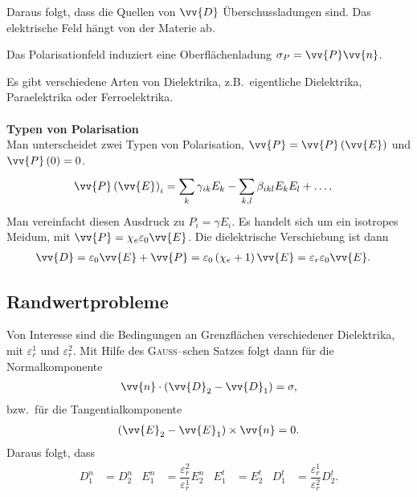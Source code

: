 \documentclass[a4paper,12pt]{article}
\numberwithin{equation}{section}
\begin{document}
Daraus folgt, dass die Quellen von $\vv{D}$ Überschussladungen sind.
Das elektrische Feld hängt von der Materie ab.\par
Das Polarisationfeld induziert eine Oberflächenladung $\sigma _P=\vv{P}\vv{n}$.\par
Es gibt verschiedene Arten von Dielektrika, z.B.\ eigentliche Dielektrika, Paraelektrika oder Ferroelektrika.
\\\hfill\\\textbf{Typen von Polarisation}\\ 
Man unterscheidet zwei Typen von Polarisation, $\vv{P}=\vv{P}\left(\vv{E}\right)$ und $\vv{P}\left(0\right)=0$.
\begin{align} 
        \vv{P}\left(\vv{E}\right)_i&=\sum_{k}^{}\gamma _{ik}E_k-\sum_{k,l}^{}\beta _{ikl}E_kE_l+\hdots 
.\end{align} 
Man vereinfacht diesen Ausdruck zu $P_i=\gamma E_i$.
Es handelt sich um ein isotropes Meidum, mit $\vv{P}=\chi_e \varepsilon _0\vv{E}$.
Die dielektrische Verschiebung ist dann
\begin{align} 
        \vv{D}=\varepsilon _0\vv{E}+\vv{P}=\varepsilon _0\left(\chi_e+1\right)\vv{E}&=\varepsilon _r\varepsilon _0\vv{E}
.\end{align} 

\subsection{Randwertprobleme}
Von Interesse sind die Bedingungen an Grenzflächen verschiedener Dielektrika, mit $\varepsilon ^1_r$ und $\varepsilon ^2_r$.
Mit Hilfe des \textsc{Gauss}--schen Satzes folgt dann für die Normalkomponente
\begin{align} 
        \vv{n}\cdot \left(\vv{D}_2-\vv{D}_1\right)=\sigma 
,\end{align} 
bzw.\ für die Tangentialkomponente
\begin{align} 
        \left(\vv{E}_2-\vv{E}_1\right)\times \vv{n}=0
.\end{align} 
Daraus folgt, dass
\begin{align} 
        D_1^n&=D_2^n&E_1^n&=\dfrac{\varepsilon _r^2}{\varepsilon _r^1}E_2^n&E_1^t&=E_2^t&D_1^t&=\dfrac{\varepsilon _r^1}{\varepsilon _r^2}D_2^t
.\end{align} 
\end{document}
